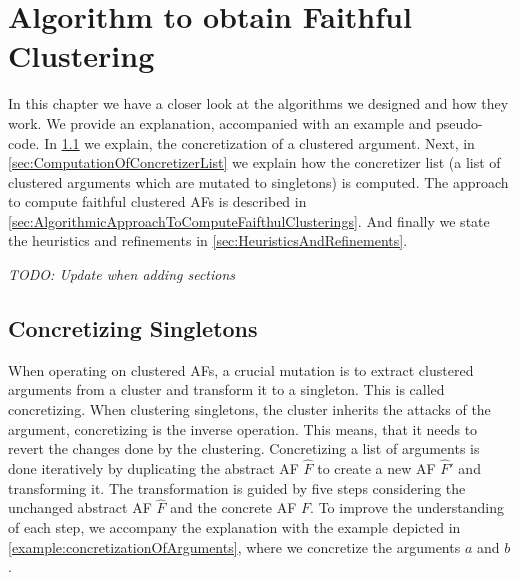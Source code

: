\chapter{Algorithm to obtain Faithful Clustering}
In this chapter we have a closer look at the algorithms we designed and how they work. We provide an explanation, accompanied with an example and pseudo-code.
In \cref{sec:ConcretizingSingletons} we explain, the concretization of a clustered argument. Next, in \cref{sec:ComputationOfConcretizerList} we explain how the concretizer list (a list of clustered arguments which are mutated to singletons) is computed. The approach to compute faithful clustered AFs is described in \cref{sec:AlgorithmicApproachToComputeFaifthulClusterings}. And finally we state the heuristics and refinements in \cref{sec:HeuristicsAndRefinements}.

\textit{TODO: Update when adding sections}

\section{Concretizing Singletons}
\label{sec:ConcretizingSingletons}
When operating on clustered AFs, a crucial mutation is to extract clustered arguments from a cluster and transform it to a singleton. This is called concretizing. When clustering singletons, the cluster inherits the attacks of the argument, concretizing is the inverse operation. This means, that it needs to revert the changes done by the clustering.
Concretizing a list of arguments is done iteratively by duplicating the abstract AF $\hat{F}$ to create a new AF $\hat{F}'$ and transforming it. The transformation is guided by five steps considering the unchanged abstract AF $\hat{F}$ and the concrete AF $F$. To improve the understanding of each step, we accompany the explanation with the example depicted in \cref{example:concretizationOfArguments}, where we concretize the arguments $a$ and $b$.

\vspace{0.3cm}

